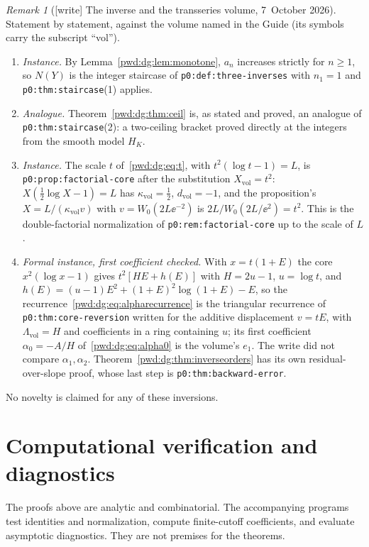 \documentclass[11pt,letterpaper]{article}
\numberwithin{equation}{section}
\theoremstyle{remark}\newtheorem{remark}[theorem]{Remark}
\newcommand{\file}[1]{\nolinkurl{#1}}
\newcommand{\vol}{\mathrm{vol}}
\begin{document}
\begin{remark}[{[write]} The inverse and the transseries volume, 7~October 2026]\label{pwd:dg:rem:transseries}
Statement by statement, against the volume named in the Guide (its symbols
carry the subscript ``vol'').
\begin{enumerate}[label=(\alph*),leftmargin=*]
\item \emph{Instance.} By Lemma~\ref{pwd:dg:lem:monotone}, $a_n$ increases
strictly for $n\ge1$, so $N(Y)$ is the integer staircase of
\file{p0:def:three-inverses} with $n_1=1$ and \file{p0:thm:staircase}(1)
applies.
\item \emph{Analogue.} Theorem~\ref{pwd:dg:thm:ceil} is, as stated and
proved, an analogue of \file{p0:thm:staircase}(2): a two-ceiling bracket
proved directly at the integers from the smooth model $H_K$.
\item \emph{Instance.} The scale $t$ of~\eqref{pwd:dg:eq:t}, with
$t^2(\log t-1)=L$, is \file{p0:prop:factorial-core} after the substitution
$X_\vol=t^2$: $X(\tfrac12\log X-1)=L$ has $\kappa_\vol=\tfrac12$,
$d_\vol=-1$, and the proposition's $X=L/(\kappa_\vol v)$ with
$v=W_0(2L\ee^{-2})$ is $2L/W_0(2L/\ee^2)=t^2$. This is the double-factorial
normalization of \file{p0:rem:factorial-core} up to the scale of $L$.
\item \emph{Formal instance, first coefficient checked.} With $x=t(1+E)$ the
core $x^2(\log x-1)$ gives $t^2[HE+h(E)]$ with $H=2u-1$, $u=\log t$, and
$h(E)=(u-1)E^2+(1+E)^2\log(1+E)-E$, so the recurrence~\eqref{pwd:dg:eq:alpharecurrence}
is the triangular recurrence of \file{p0:thm:core-reversion} written for the
additive displacement $v=tE$, with $\Lambda_\vol=H$ and coefficients in a
ring containing $u$; its first coefficient $\alpha_0=-A/H$
of~\eqref{pwd:dg:eq:alpha0} is the volume's $e_1$. The write did not compare
$\alpha_1,\alpha_2$. Theorem~\ref{pwd:dg:thm:inverseorders} has its own
residual-over-slope proof, whose last step is \file{p0:thm:backward-error}.
\end{enumerate}
No novelty is claimed for any of these inversions.
\end{remark}

\section{Computational verification and diagnostics}\label{pwd:dg:sec:computations}
The proofs above are analytic and combinatorial. The accompanying programs test identities and normalization, compute finite-cutoff coefficients, and evaluate asymptotic diagnostics. They are not premises for the theorems.
\end{document}
